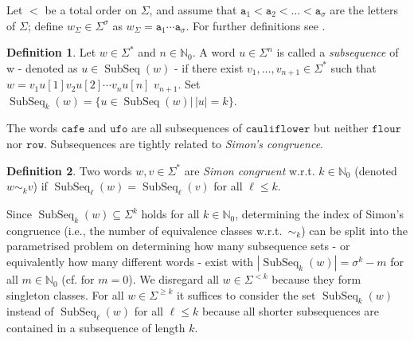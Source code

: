 \documentclass[10pt,a4paper]{amsart}
\newcommand{\N}{\mathbb{N}}
\def\ta{\mathtt{a}}
\DeclareMathOperator\ScatFact{SubSeq}
\DeclareMathOperator{\cond}{cond}
\theoremstyle{plain}
\theoremstyle{definition}
\newtheorem{definition}{Definition}
\begin{document}
Let $<$ be a total order on $\Sigma$, and assume that $\ta_1<\ta_2<\ldots < \ta_\sigma$ are the letters of $\Sigma$; define $w_{\Sigma} \in \Sigma^{\sigma}$ as $w_{\Sigma}=\ta_1\cdots\ta_{\sigma}$.
For further definitions see \cite{lothaire}. %

\begin{definition}
	Let $w \in \Sigma^*$ and $n \in \mathbb{N}_0$. A word $u \in \Sigma^n$ is called a \emph{subsequence} of w - denoted as $u \in \ScatFact(w)$ - if there exist $v_1,\dots, v_{n+1} \in \Sigma^*$ such that $w = v_1 u[1] v_2 u[2] \cdots v_n u[n]$ $v_{n+1}$.
	Set $\ScatFact_k(w)=\{u\in\ScatFact(w)|\,|u|=k\}$.
\end{definition}

The words $\mathtt{cafe}$ and $\mathtt{ufo}$ are all subsequences of $\mathtt{cauliflower}$ but neither $\mathtt{flour}$ nor $\mathtt{row}$. Subsequences are tightly related to {\em Simon's congruence}. 

\begin{definition}
	Two words $w,v \in \Sigma^*$ are \emph{Simon congruent} w.r.t. $k\in\N_0$ (denoted $w \sim_k v$) if $\operatorname{\ScatFact}_{\ell}(w) = \operatorname{\ScatFact}_{\ell}(v)$ for all $\ell\leq k$. 
\end{definition}

Since $\ScatFact_k(w)\subseteq\Sigma^k$ holds for all $k\in\N_0$, determining the index of Simon's
congruence (i.e., the number of equivalence classes w.r.t.~$\sim_k$) can be split into the parametrised problem on determining how many subsequence sets 
- or equivalently how many different words - exist with $|\ScatFact_k(w)|=\sigma^k-m$ for all 
$m\in\N_0$ (cf. \cite{DBLP:conf/dlt/BarkerFHMN20,DBLP:conf/stacs/DayFKKMS21} for $m=0$).
We disregard all \(w \in \Sigma^{<k}\) because they form singleton classes. For all \(w\in\Sigma^{\geq k}\) it suffices to consider the set \(\ScatFact_k(w)\) instead of $\ScatFact_{\ell}(w)$ for all $\ell \leq k$ because all shorter subsequences are contained in a subsequence of length \(k\).
\end{document}
